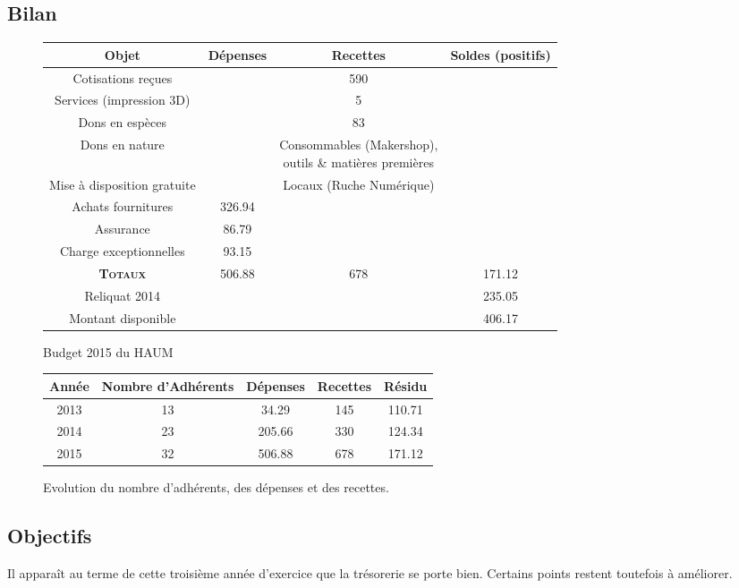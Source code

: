 \documentclass[a4paper, 11pt]{article}
\begin{document}
\subsection{Bilan}

\begin{figure}[!ht]\centering
	\begin{tabular}{c|ccc}
		Objet & Dépenses & Recettes & Soldes (positifs)\\\hline
		Cotisations reçues & & 590 & \\
		Services (impression 3D) & & 5 & \\
		Dons en espèces & & 83 & \\
		Dons en nature & & \parbox[c]{5cm}{Consommables (Makershop),\\outils \& matières premières}  & \\
		Mise à disposition gratuite & & Locaux (Ruche Numérique) & \\\hline\hline
		Achats fournitures & 326.94 & & \\
		Assurance & 86.79 & & \\
		Charge exceptionnelles & 93.15 & & \\\hline\hline
		\textsc{\textbf{Totaux}} & 506.88 & 678 & 171.12\\\hline
		Reliquat 2014 & & & 235.05\\
		Montant disponible & & & 406.17
	\end{tabular}
	\caption{Budget 2015 du HAUM}
\end{figure}

\begin{figure}[!ht]\centering
\begin{tabular}{c|c|cc|c}
	Année & Nombre d'Adhérents & Dépenses & Recettes & Résidu\\\hline
	2013 & 13 & 34.29 & 145 & 110.71\\
	2014 & 23 & 205.66 & 330 & 124.34\\
	2015 & 32 & 506.88 & 678 & 171.12
\end{tabular}
\caption{Evolution du nombre d'adhérents, des dépenses et des recettes.}
\end{figure}

\subsection{Objectifs}

Il apparaît au terme de cette troisième année d'exercice que la trésorerie se porte bien. Certains points restent
toutefois à améliorer.
\end{document}
